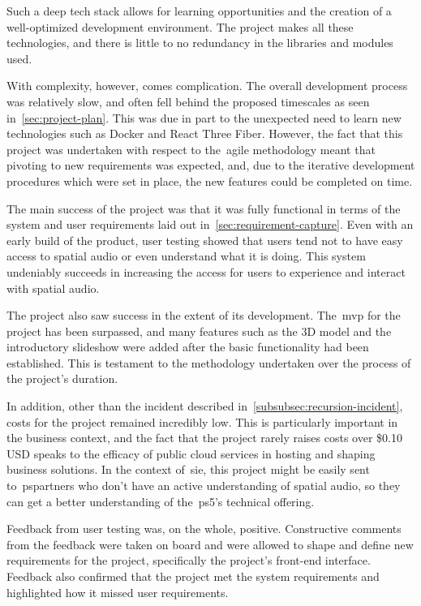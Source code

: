 Such a deep tech stack allows for learning opportunities and the creation of a well-optimized development environment.
The project makes all these technologies, and there is little to no redundancy in the libraries and modules used.

With complexity, however, comes complication.
The overall development process was relatively slow,
and often fell behind the proposed timescales as seen in~\ref{sec:project-plan}.
This was due in part to the unexpected need to learn new technologies such as Docker and React Three Fiber.
However,
the fact that this project was undertaken with respect to the~\gls{agile} methodology meant
that pivoting to new requirements was expected, and,
due to the iterative development procedures which were set in place,
the new features could be completed on time.

The main success of the project was
that it was fully functional in terms of the system and user requirements laid out in~\ref{sec:requirement-capture}.
Even with an early build of the product,
user testing showed that users tend not to have easy access to spatial audio or even understand what it is doing.
This system undeniably succeeds in increasing the access for users to experience and interact with spatial audio.

The project also saw success in the extent of its development.
The~\gls{mvp} for the project has been surpassed,
and many features such as the 3D model and the introductory slideshow were added
after the basic functionality had been established.
This is testament to the methodology undertaken over the process of the project's duration.

In addition, other than the incident described in~\ref{subsubsec:recursion-incident},
costs for the project remained incredibly low.
This is particularly important in the business context,
and the fact that the project rarely raises costs over \$0.10 USD speaks to the efficacy of public cloud services
in hosting and shaping business solutions.
In the context of~\gls{sie},
this project might be easily sent
to~\glspl{pspartner} who don't have an active understanding of spatial audio,
so they can get a better understanding of the~\gls{ps5}'s technical offering.

Feedback from user testing was, on the whole, positive.
Constructive comments from the feedback were taken on board
and were allowed to shape and define new requirements for the project, specifically the project's front-end interface.
Feedback also confirmed that the project met the system requirements and highlighted how it missed user requirements.

